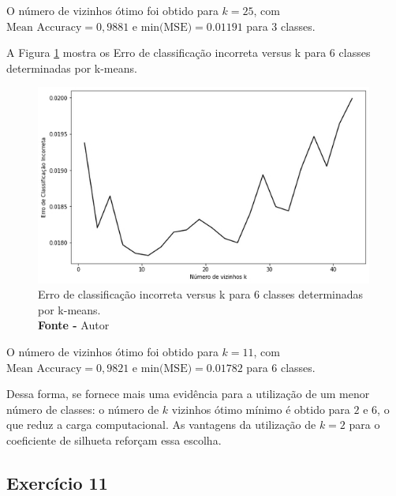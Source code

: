 O número de vizinhos ótimo foi obtido para $k = 25$, com $\text{Mean Accuracy} = 0,9881$ e $\text{min(MSE)} = 0.01191$ para $3$ classes.


A Figura \ref{fig: Erro de classificação incorreta versus k para 6 classes determinadas por k-means} mostra os Erro de classificação incorreta versus k para 6 classes determinadas por k-means.
\begin{figure}[H]
    \centering
    \includegraphics[width=0.99\textwidth]{Figuras/4. Resultados e Discussões/Exer4/Erro de classificação incorreta versus k para 6 classes determinadas por k-means.jpg}
    \caption{Erro de classificação incorreta versus k para 6 classes determinadas por k-means.\\ \textbf{Fonte -} Autor}
    \label{fig: Erro de classificação incorreta versus k para 6 classes determinadas por k-means}
\end{figure}

O número de vizinhos ótimo foi obtido para $k = 11$, com $\text{Mean Accuracy} = 0,9821$ e $\text{min(MSE)} = 0.01782$ para $6$ classes.

Dessa forma, se fornece mais uma evidência para a utilização de um menor número de classes: o número de $k$ vizinhos ótimo mínimo é obtido para $2$ e $6$, o que reduz a carga computacional. As vantagens da utilização de $k = 2$ para o coeficiente de silhueta reforçam essa escolha.  

\subsection{Exercício 11}
 
